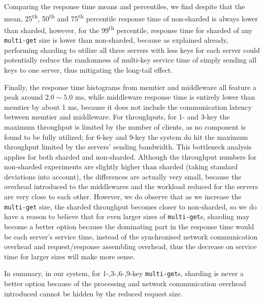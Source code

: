 Comparing the response time means and percentiles, we find despite that the mean, 25\textsuperscript{th}, 50\textsuperscript{th} and 75\textsuperscript{th} percentile response time of non-sharded is always lower than sharded, however, for the 99\textsuperscript{th} percentile, response time for sharded of any \texttt{multi-get} size is lower than non-sharded, because as explained already, performing sharding to utilize all three servers with less keys for each server could potentially reduce the randomness of multi-key service time of simply sending all keys to one server, thus mitigating the long-tail effect.

Finally, the response time histograms from memtier and middleware all feature a peak around $2.0 \sim 5.0$ ms, while middleware response time is entirely lower than memtier by about 1 ms, because it does not include the communication latency between memtier and middleware. For throughputs, for 1- and 3-key the maximum throughput is limited by the number of clients, as no component is found to be fully utilized; for 6-key and 9-key the system do hit the maximum throughput limited by the servers' sending bandwidth. This bottleneck analysis applies for both sharded and non-sharded. Although the throughput numbers for non-sharded experiments are slightly higher than sharded (taking standard deviations into account), the differences are actually very small, because the overhead introduced to the middlewares and the workload reduced for the servers are very close to each other. However, we do observe that as we increase the \texttt{multi-get} size, the sharded throughput becomes closer to non-sharded, so we do have a reason to believe that for even larger sizes of \texttt{multi-get}s, sharding may become a better option because the dominating part in the response time would be each server's service time, instead of the synchronised network communication overhead and request/response assembling overhead, thus the decrease on service time for larger sizes will make more sense.

In summary, in our system, for 1-,3-,6-,9-key \texttt{multi-get}s, sharding is never a better option because of the processing and network communication overhead introduced cannot be hidden by the reduced request size.